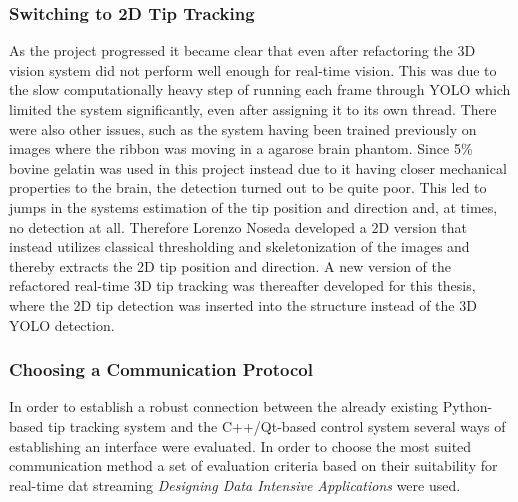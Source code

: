 \subsubsection{Switching to 2D Tip Tracking}
As the project progressed it became clear that even after refactoring the 3D vision system did not perform well enough for real-time vision. This was due to the slow computationally heavy step of running each frame through YOLO which limited the system significantly, even after assigning it to its own thread. There were also other issues, such as the system having been trained previously on images where the ribbon was moving in a agarose brain phantom. Since 5\% bovine gelatin was used in this project instead due to it having closer mechanical properties to the brain, the detection turned out to be quite poor. This led to jumps in the systems estimation of the tip position and direction and, at times, no detection at all.
\newline \newline
Therefore Lorenzo Noseda developed a 2D version that instead utilizes classical thresholding and skeletonization of the images and thereby extracts the 2D tip position and direction. A new version of the refactored real-time 3D tip tracking was thereafter developed for this thesis, where the 2D tip detection was inserted into the structure instead of the 3D YOLO detection.

\subsubsection{Choosing a Communication Protocol}
In order to establish a robust connection between the already existing Python-based tip tracking system and the C++/Qt-based control system several ways of establishing an interface were evaluated. In order to choose the most suited communication method a set of evaluation criteria based on their suitability for real-time dat streaming \textit{Designing Data Intensive Applications} \cite{kleppmann_designing_2017} were used.

